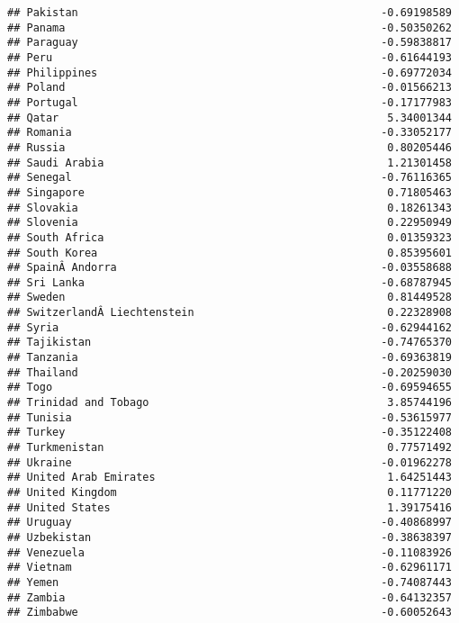 \documentclass[
]{article}
\begin{document}
\begin{verbatim}
## Pakistan                                               -0.69198589
## Panama                                                 -0.50350262
## Paraguay                                               -0.59838817
## Peru                                                   -0.61644193
## Philippines                                            -0.69772034
## Poland                                                 -0.01566213
## Portugal                                               -0.17177983
## Qatar                                                   5.34001344
## Romania                                                -0.33052177
## Russia                                                  0.80205446
## Saudi Arabia                                            1.21301458
## Senegal                                                -0.76116365
## Singapore                                               0.71805463
## Slovakia                                                0.18261343
## Slovenia                                                0.22950949
## South Africa                                            0.01359323
## South Korea                                             0.85395601
## SpainÂ Andorra                                         -0.03558688
## Sri Lanka                                              -0.68787945
## Sweden                                                  0.81449528
## SwitzerlandÂ Liechtenstein                              0.22328908
## Syria                                                  -0.62944162
## Tajikistan                                             -0.74765370
## Tanzania                                               -0.69363819
## Thailand                                               -0.20259030
## Togo                                                   -0.69594655
## Trinidad and Tobago                                     3.85744196
## Tunisia                                                -0.53615977
## Turkey                                                 -0.35122408
## Turkmenistan                                            0.77571492
## Ukraine                                                -0.01962278
## United Arab Emirates                                    1.64251443
## United Kingdom                                          0.11771220
## United States                                           1.39175416
## Uruguay                                                -0.40868997
## Uzbekistan                                             -0.38638397
## Venezuela                                              -0.11083926
## Vietnam                                                -0.62961171
## Yemen                                                  -0.74087443
## Zambia                                                 -0.64132357
## Zimbabwe                                               -0.60052643
\end{verbatim}
\end{document}

